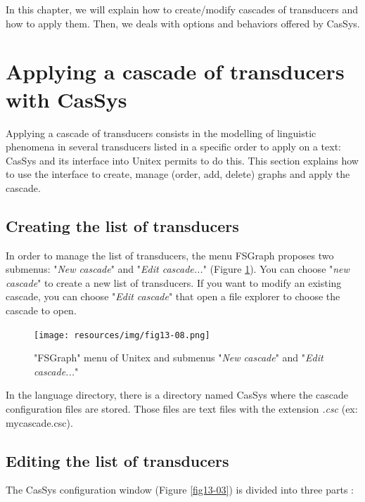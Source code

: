 \bigskip
\noindent  
In this chapter, we will explain how to create/modify cascades of transducers and how to apply them. Then, we deals with options and behaviors offered by CasSys.

\section{Applying a cascade of transducers with CasSys}
\label{section:applyCascade}
Applying a cascade of transducers consists in the modelling of linguistic phenomena in several transducers listed in a specific order to apply on a text: CasSys and its interface into Unitex permits to do this. This section explains how to use the interface to create, manage (order, add, delete) graphs and apply the cascade.   

\subsection{Creating the list of transducers}
\label{subsec:listTrans}

\bigskip
\noindent 
In order to manage the list of transducers, the menu FSGraph proposes two submenus: "\textit{New cascade}" and "\textit{Edit cascade...}" (Figure \ref{fig13-08}). You can choose "\textit{new cascade}" to create a new list of transducers. If you want to modify an existing cascade, you can choose "\textit{Edit cascade}" that open a file explorer to choose the cascade to open. 

\begin{figure}[!htb]
 \centering
 \texttt{[image: resources/img/fig13-08.png]}
 \caption{"FSGraph" menu of Unitex and submenus "\textit{New cascade}" and "\textit{Edit cascade...}"}
 \label{fig13-08}
\end{figure}

In the language directory, there is a directory named CasSys where the cascade configuration files are stored. Those files are text files with the extension \textit{.csc} (ex: mycascade.csc).

\subsection{Editing the list of transducers}
\label{subsec:editlistTrans}

The CasSys configuration window (Figure \ref{fig13-03}) is divided into three parts :


